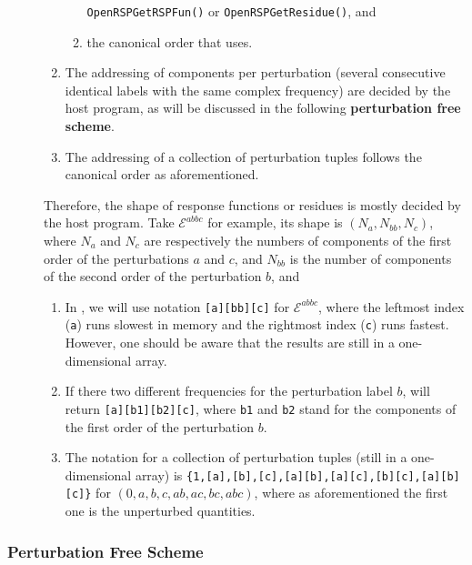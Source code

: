 \begin{description}
\begin{enumerate}
\begin{enumerate}
            \texttt{OpenRSPGetRSPFun()} or \texttt{OpenRSPGetResidue()}, and
          \item the canonical order that \LibName uses.
        \end{enumerate}
      \item The addressing of components per perturbation (several consecutive
        identical labels with the same complex frequency) are decided by the
        host program, as will be discussed in the following
        \textbf{perturbation free scheme}.
      \item The addressing of a collection of perturbation tuples follows the
        canonical order as aforementioned.
    \end{enumerate}

    Therefore, the shape of response functions or residues is mostly decided
    by the host program. Take $\mathcal{E}^{abbc}$ for example, its shape is
    $(N_{a},N_{bb},N_{c})$, where $N_{a}$ and $N_{c}$ are respectively the
    numbers of components of the first order of the perturbations $a$ and $c$,
    and $N_{bb}$ is the number of components of the second order of the
    perturbation $b$, and
    \begin{enumerate}
      \item In \LibName, we will use notation \texttt{[a][bb][c]} for
        $\mathcal{E}^{abbc}$, where the leftmost index (\texttt{a}) runs
        slowest in memory and the rightmost index (\texttt{c}) runs fastest.
        However, one should be aware that the results are still in a
        one-dimensional array.
      \item If there two different frequencies for the perturbation label
        $b$, \LibName will return \texttt{[a][b1][b2][c]}, where \texttt{b1}
        and \texttt{b2} stand for the components of the first order of the
        perturbation $b$.
      \item The notation for a collection of perturbation tuples (still in a
        one-dimensional array) is
        \texttt{\{1,[a],[b],[c],[a][b],[a][c],[b][c],[a][b][c]\}}
        for $(0,a,b,c,ab,ac,bc,abc)$, where as aforementioned the first one
        is the unperturbed quantities.
    \end{enumerate}
\end{description}

\subsubsection{Perturbation Free Scheme}

